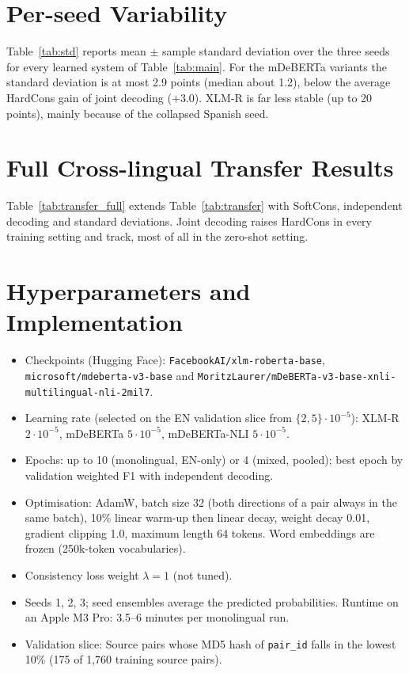 \section{Per-seed Variability}
\label{app:std}

Table~\ref{tab:std} reports mean $\pm$ sample standard deviation over the three seeds for every learned system of Table~\ref{tab:main}. For the mDeBERTa variants the standard deviation is at most 2.9 points (median about 1.2), below the average HardCons gain of joint decoding ($+3.0$). XLM-R is far less stable (up to 20 points), mainly because of the collapsed Spanish seed.



\section{Full Cross-lingual Transfer Results}
\label{app:transfer}

Table~\ref{tab:transfer_full} extends Table~\ref{tab:transfer} with SoftCons, independent decoding and standard deviations. Joint decoding raises HardCons in every training setting and track, most of all in the zero-shot setting.



\section{Hyperparameters and Implementation}
\label{app:hparams}

\begin{itemize}\itemsep0pt
\item Checkpoints (Hugging Face): \texttt{FacebookAI/xlm-roberta-base}, \texttt{microsoft/mdeberta-v3-base} and \texttt{MoritzLaurer/mDeBERTa-v3-base-xnli-}\allowbreak\texttt{multilingual-nli-2mil7}.
\item Learning rate (selected on the EN validation slice from $\{2,5\}\cdot10^{-5}$): XLM-R $2\cdot10^{-5}$, mDeBERTa $5\cdot10^{-5}$, mDeBERTa-NLI $5\cdot10^{-5}$.
\item Epochs: up to 10 (monolingual, EN-only) or 4 (mixed, pooled); best epoch by validation weighted F1 with independent decoding.
\item Optimisation: AdamW, batch size 32 (both directions of a pair always in the same batch), 10\% linear warm-up then linear decay, weight decay 0.01, gradient clipping 1.0, maximum length 64 tokens. Word embeddings are frozen (250k-token vocabularies).
\item Consistency loss weight $\lambda=1$ (not tuned).
\item Seeds 1, 2, 3; seed ensembles average the predicted probabilities. Runtime on an Apple M3 Pro: 3.5--6 minutes per monolingual run.
\item Validation slice: Source pairs whose MD5 hash of \texttt{pair\_id} falls in the lowest 10\% (175 of 1{,}760 training source pairs).
\end{itemize}
